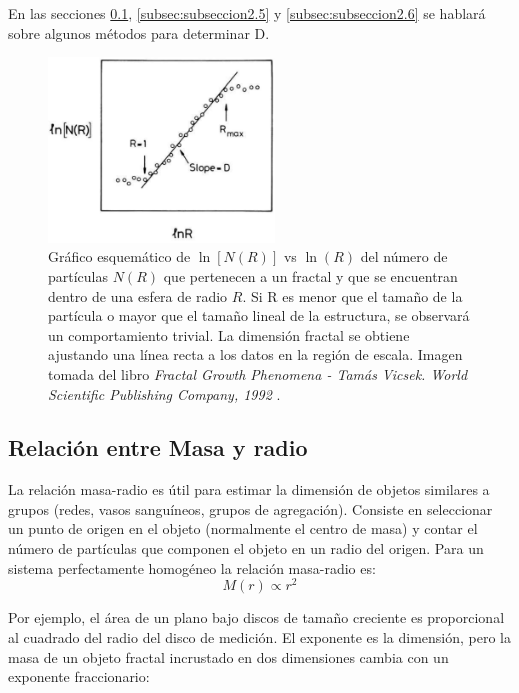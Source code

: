 \documentclass[11pt]{article}
\begin{document}
En las secciones \ref{subsec:subseccion2.4}, \ref{subsec:subseccion2.5} y \ref{subsec:subseccion2.6} se hablar\'{a} sobre algunos m\'{e}todos para determinar D. 
  
\begin{figure}[h!]
\vspace{1cm}
\centering
{\includegraphics[width=6cm]{Vicsek-Fractal} \par}
\caption{ Gráfico esquem\'{a}tico de $\ln[N(R)]$ vs $\ln (R)$  del número de partículas $N(R)$ que pertenecen a un fractal y que se encuentran dentro de una esfera de radio $R$. Si R es menor que el tamaño de la partícula o mayor que el tamaño lineal de la estructura, se observar\'{a} un comportamiento trivial. La dimensión fractal se obtiene ajustando una línea recta a los datos en la región de escala. Imagen tomada del libro \textit{Fractal Growth Phenomena - Tam\'{a}s Vicsek. World Scientific Publishing Company, 1992} \cite{Vicsek1992}.}
\label{fig:Vicsek-Fractal}
\end{figure}
 

\subsection{Relaci\'{o}n entre Masa y radio}
\label{subsec:subseccion2.4}

La relaci\'{o}n masa-radio es \'{u}til para estimar la dimensi\'{o}n de objetos similares a grupos (redes, vasos sangu\'{i}neos, grupos de agregaci\'{o}n). Consiste en seleccionar un punto de origen en el objeto (normalmente el centro de masa) y contar el n\'{u}mero de part\'{i}culas que componen el objeto en un radio del origen. Para un sistema perfectamente homog\'{e}neo la relaci\'{o}n masa-radio es:
\begin{equation}
M(r) \propto r^{2}
\end{equation}

Por ejemplo, el \'{a}rea de un plano bajo discos de tamaño creciente es proporcional al cuadrado del radio del disco de medici\'{o}n. El exponente es la dimensi\'{o}n, pero la masa de un objeto fractal incrustado en dos dimensiones cambia con un exponente fraccionario:
\end{document}
